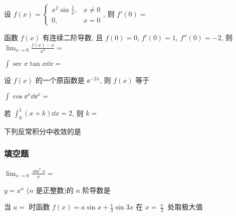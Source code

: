 \begin{ti}
	设 $f(x)=
	\begin{cases}
	x^2\sin\frac{1}{x}, & x\ne0\\
	0, & x=0
	\end{cases}
	$, 则 $f'(0)=$ \kuo
\end{ti}

\begin{ti}
	函数 $f(x)$ 有连续二阶导数, 且 $f(0)=0$, $f'(0)=1$, $f''(0)=-2$, 则 $\lim_{x\to0}\frac{f(x)-x}{x^2}=$ \kuo
\end{ti}

\begin{ti}
	$\int \sec x\tan x\dd{x}=$ \kuo
\end{ti}

\begin{ti}
	设 $f(x)$ 的一个原函数是 $\ee^{-2x}$, 则 $f(x)$ 等于\kuo
\end{ti}

\begin{ti}
	$\int\cos\ee^x\dd{\ee^x}=$ \kuo
\end{ti}

\begin{ti}
	若 $\int_{0}^{1}(x+k)\dd{x}=2$, 则 $k=$ \kuo
\end{ti}

\begin{ti}
	下列反常积分中收敛的是\kuo
\end{ti}

\subsubsection{填空题}
\begin{ti}
	$\lim_{x\to0}\frac{\sin^2x}{x}=$ \hua
\end{ti}

\begin{ti}
	$y=x^n$ ($n$ 是正整数)的 $n$ 阶导数是 \hua
\end{ti}

\begin{ti}
	当 $a = $ \hua{} 时函数 $f(x)=a\sin x+\frac13\sin3x$ 在 $x=\frac{\uppi}{3}$ 处取极大值
\end{ti}

